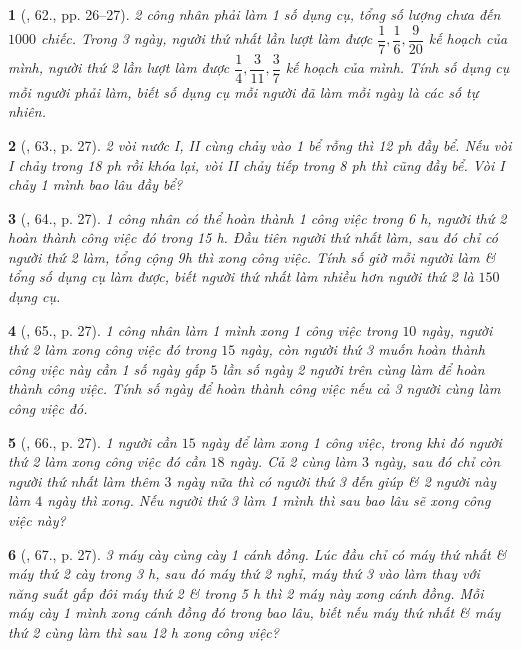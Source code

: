\documentclass{article}
\newtheorem{baitoan}{}
\begin{document}
\begin{baitoan}[\cite{Binh_Toan_6_tap_2}, 62., pp. 26--27]
	2 công nhân phải làm 1 số dụng cụ, tổng số lượng chưa đến $1000$ chiếc. Trong 3 ngày, người thứ nhất lần lượt làm được $\dfrac{1}{7},\dfrac{1}{6},\dfrac{9}{20}$ kế hoạch của mình, người thứ 2 lần lượt làm được $\dfrac{1}{4},\dfrac{3}{11},\dfrac{3}{7}$ kế hoạch của mình. Tính số dụng cụ mỗi người phải làm, biết số dụng cụ mỗi người đã làm mỗi ngày là các số tự nhiên.
\end{baitoan}

\begin{baitoan}[\cite{Binh_Toan_6_tap_2}, 63., p. 27]
	2 vòi nước I, II cùng chảy vào 1 bể rỗng thì {\rm12 ph} đầy bể. Nếu vòi I chảy trong {\rm18 ph} rồi khóa lại, vòi II chảy tiếp trong {\rm8 ph} thì cũng đầy bể. Vòi I chảy 1 mình bao lâu đầy bể?
\end{baitoan}

\begin{baitoan}[\cite{Binh_Toan_6_tap_2}, 64., p. 27]
	1 công nhân có thể hoàn thành 1 công việc trong {\rm6 h}, người thứ 2 hoàn thành công việc đó trong {\rm15 h}. Đầu tiên người thứ nhất làm, sau đó chỉ có người thứ 2 làm, tổng cộng {\rm9h} thì xong công việc. Tính số giờ mỗi người làm \& tổng số dụng cụ làm được, biết người thứ nhất làm nhiều hơn người thứ 2 là $150$ dụng cụ.
\end{baitoan}

\begin{baitoan}[\cite{Binh_Toan_6_tap_2}, 65., p. 27]
	1 công nhân làm 1 mình xong 1 công việc trong $10$ ngày, người thứ 2 làm xong công việc đó trong $15$ ngày, còn người thứ 3 muốn hoàn thành công việc này cần 1 số ngày gấp $5$ lần số ngày 2 người trên cùng làm để hoàn thành công việc. Tính số ngày để hoàn thành công việc nếu cả 3 người cùng làm công việc đó.
\end{baitoan}

\begin{baitoan}[\cite{Binh_Toan_6_tap_2}, 66., p. 27]
	1 người cần $15$ ngày để làm xong 1 công việc, trong khi đó người thứ 2 làm xong công việc đó cần $18$ ngày. Cả 2 cùng làm $3$ ngày, sau đó chỉ còn người thứ nhất làm thêm $3$ ngày nữa thì có người thứ 3 đến giúp \& 2 người này làm $4$ ngày thì xong. Nếu người thứ 3 làm 1 mình thì sau bao lâu sẽ xong công việc này?
\end{baitoan}

\begin{baitoan}[\cite{Binh_Toan_6_tap_2}, 67., p. 27]
	3 máy cày cùng cày 1 cánh đồng. Lúc đầu chỉ có máy thứ nhất \& máy thứ 2 cày trong {\rm3 h}, sau đó máy thứ 2 nghỉ, máy thứ 3 vào làm thay với năng suất gấp đôi máy thứ 2 \& trong {\rm5 h} thì 2 máy này xong cánh đồng. Mỗi máy cày 1 mình xong cánh đồng đó trong bao lâu, biết nếu máy thứ nhất \& máy thứ 2 cùng làm thì sau {\rm12 h} xong công việc?
\end{baitoan}
\end{document}
